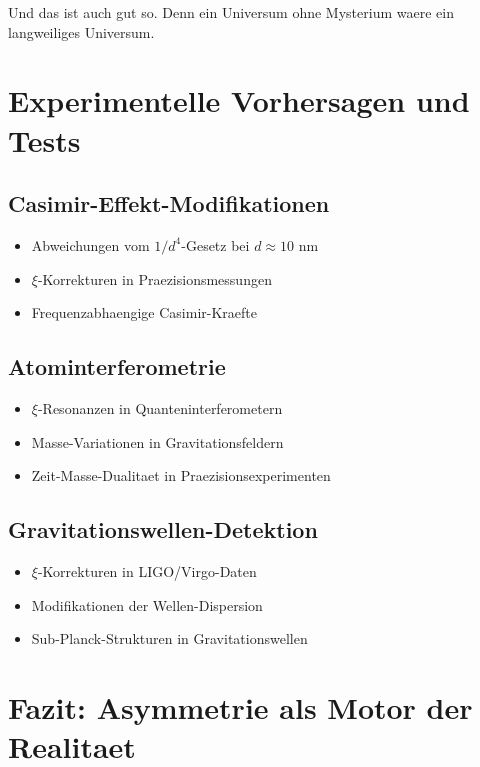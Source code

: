 \documentclass[12pt,a4paper]{article}
\newcommand{\xipar}{\xi}
\theoremstyle{definition}
\theoremstyle{remark}
\begin{document}
	Und das ist auch gut so. Denn ein Universum ohne Mysterium waere ein langweiliges Universum.
	
	\section{Experimentelle Vorhersagen und Tests}
	
	\subsection{Casimir-Effekt-Modifikationen}
	
	\begin{itemize}
		\item Abweichungen vom $1/d^4$-Gesetz bei $d \approx 10$ nm
		\item $\xipar$-Korrekturen in Praezisionsmessungen
		\item Frequenzabhaengige Casimir-Kraefte
	\end{itemize}
	
	\subsection{Atominterferometrie}
	
	\begin{itemize}
		\item $\xipar$-Resonanzen in Quanteninterferometern
		\item Masse-Variationen in Gravitationsfeldern
		\item Zeit-Masse-Dualitaet in Praezisionsexperimenten
	\end{itemize}
	
	\subsection{Gravitationswellen-Detektion}
	
	\begin{itemize}
		\item $\xipar$-Korrekturen in LIGO/Virgo-Daten
		\item Modifikationen der Wellen-Dispersion
		\item Sub-Planck-Strukturen in Gravitationswellen
	\end{itemize}
	
	\section{Fazit: Asymmetrie als Motor der Realitaet}
	
\end{document}
